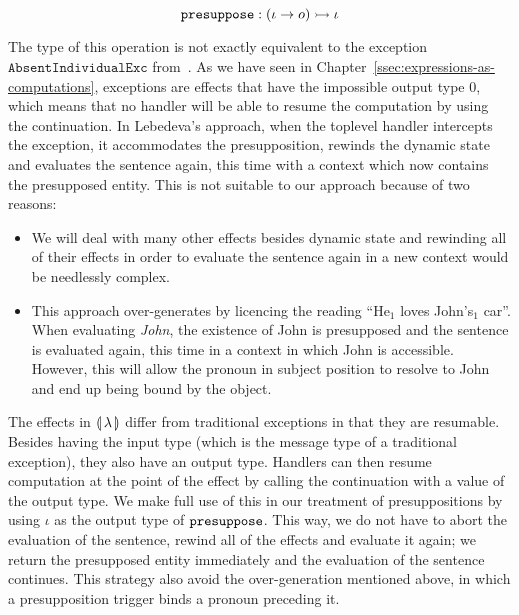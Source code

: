 $$
\mathtt{presuppose} : (\iota \to o) \rightarrowtail \iota
$$

The type of this operation is not exactly equivalent to the exception
$\texttt{AbsentIndividualExc}$ from~\cite{lebedeva2012expression}. As we
have seen in Chapter~\ref{ssec:expressions-as-computations}, exceptions are
effects that have the impossible output type $0$, which means that no
handler will be able to resume the computation by using the
continuation. In Lebedeva's approach, when the toplevel handler intercepts
the exception, it accommodates the presupposition, rewinds the dynamic
state and evaluates the sentence again, this time with a context which now
contains the presupposed entity. This is not suitable to our approach
because of two reasons:

\begin{itemize}
\item We will deal with many other effects besides dynamic state and
  rewinding all of their effects in order to evaluate the sentence again in
  a new context would be needlessly complex.
\item This approach over-generates by licencing the reading ``He$_1$ loves
  John's$_1$ car''. When evaluating \emph{John}, the existence of John is
  presupposed and the sentence is evaluated again, this time in a context
  in which John is accessible. However, this will allow the pronoun in
  subject position to resolve to John and end up being bound by the object.
\end{itemize}

The effects in $\llparenthesis \, \lambda \, \rrparenthesis$ differ from traditional exceptions in
that they are resumable. Besides having the input type (which is the
message type of a traditional exception), they also have an output
type. Handlers can then resume computation at the point of the effect by
calling the continuation with a value of the output type. We make full use
of this in our treatment of presuppositions by using $\iota$ as the output
type of $\mathtt{presuppose}$. This way, we do not have to abort the evaluation
of the sentence, rewind all of the effects and evaluate it again; we return
the presupposed entity immediately and the evaluation of the sentence
continues. This strategy also avoid the over-generation mentioned above, in
which a presupposition trigger binds a pronoun preceding it.

